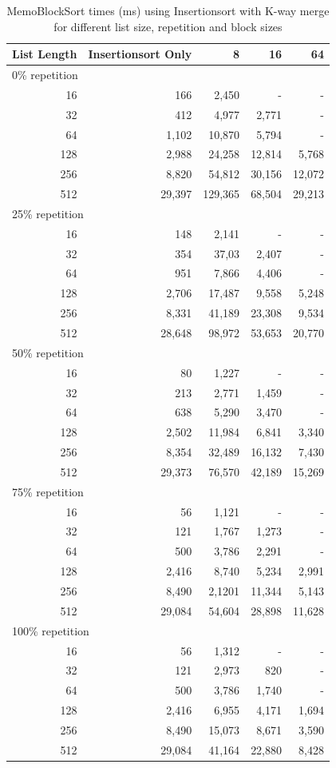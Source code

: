 \documentclass[a4paper,12pt]{article}
\begin{document}
\begin{table}[H]
\centering
\begin{tabular}{|r|r|r|r|r|}   \hline
	{List Length} & {Insertionsort Only} & {8} & {16} & {64} \\  \hline
	\multicolumn{5}{|l|}{ 0\% repetition} \\ \hline
	16 &166&2,450&- & - \\ 
	32 &412&4,977&2,771 & -\\ 
	64 &1,102&10,870 & 5,794 &-\\ 
	128 &2,988&24,258&12,814&5,768\\ 
	256 &8,820&54,812&30,156&12,072\\ 
	512 &29,397& 129,365&68,504&29,213\\  \hline
	\multicolumn{5}{|l|}{ 25\% repetition} \\ \hline
	16 &148&2,141&- & - \\ 
	32 &354&37,03&2,407 & -\\ 
	64 &951&7,866 & 4,406&-\\ 
	128 &2,706&17,487&9,558&5,248\\ 
	256 &8,331&41,189&23,308&9,534\\ 
	512 &28,648&98,972&53,653&20,770\\  \hline
	\multicolumn{5}{|l|}{ 50\% repetition} \\ \hline
	16 &80&1,227&- & - \\ 
	32 &213&2,771&1,459 & -\\ 
	64 &638&5,290& 3,470&-\\ 
	128 &2,502&11,984&6,841&3,340\\ 
	256 &8,354&32,489&16,132&7,430\\ 
	512 &29,373&76,570&42,189&15,269\\  \hline
	\multicolumn{5}{|l|}{ 75\% repetition} \\ \hline
	16 &56&1,121&- & - \\ 
	32 &121&1,767&1,273 & -\\ 
	64 &500&3,786& 2,291&-\\ 
	128 &2,416&8,740&5,234&2,991\\ 
	256 &8,490&2,1201&11,344&5,143\\ 
	512 &29,084&54,604&28,898&11,628\\  \hline
	\multicolumn{5}{|l|}{ 100\% repetition} \\ \hline
	16 &56&1,312&- & - \\ 
	32 &121&2,973&820 & -\\ 
	64 &500&3,786& 1,740&-\\ 
	128 &2,416&6,955&4,171&1,694\\ 
	256 &8,490&15,073&8,671&3,590\\ 
	512 &29,084&41,164&22,880&8,428\\  \hline
\end{tabular}
\caption{MemoBlockSort times (ms) using Insertionsort with K-way merge for different list size, repetition and block sizes}
\end{table}
\end{document}
